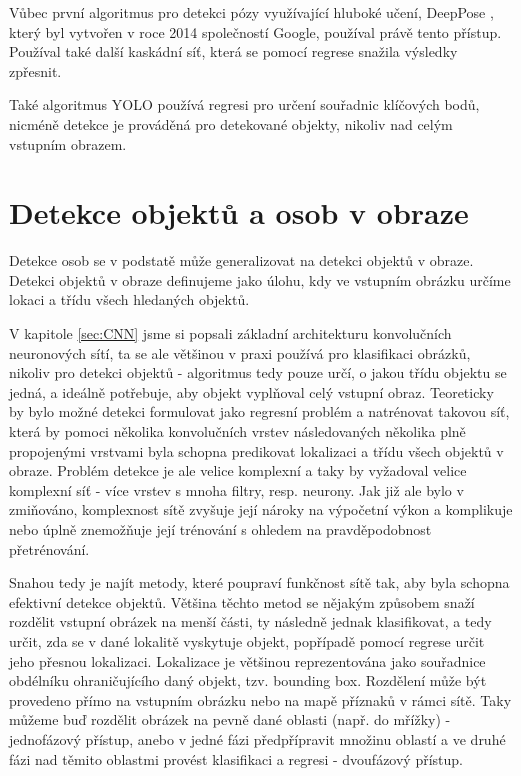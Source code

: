 Vůbec první algoritmus pro detekci pózy využívající hluboké učení, DeepPose \cite{deep-pose}, který byl
vytvořen v roce 2014 společností Google, používal právě tento přístup. Používal
také další kaskádní síť, která se pomocí regrese snažila výsledky zpřesnit. 

Také algoritmus YOLO používá regresi pro určení souřadnic klíčových bodů,
nicméně detekce je prováděná pro detekované objekty, nikoliv nad celým vstupním
obrazem. \cite{yolo-pose}


\section{Detekce objektů a osob v obraze}

Detekce osob se v podstatě může generalizovat na detekci objektů v obraze.
Detekci objektů v obraze definujeme jako úlohu, kdy ve vstupním obrázku určíme
lokaci a třídu všech hledaných objektů.

V kapitole \ref{sec:CNN} jsme si popsali základní architekturu konvolučních
neuronových sítí, ta se ale většinou v praxi používá pro klasifikaci obrázků,
nikoliv pro detekci objektů - algoritmus tedy pouze určí, o jakou třídu objektu
se jedná, a ideálně potřebuje, aby objekt vyplňoval celý vstupní obraz.
Teoreticky by bylo možné detekci formulovat jako regresní problém a natrénovat
takovou síť, která by pomoci několika konvolučních vrstev následovaných
několika plně propojenými vrstvami byla schopna predikovat lokalizaci a třídu
všech objektů v obraze. \cite{szegedy} Problém detekce je ale velice komplexní
a taky by vyžadoval velice komplexní síť - více vrstev s mnoha filtry, resp.
neurony. Jak již ale bylo v zmiňováno, komplexnost sítě zvyšuje její nároky na
výpočetní výkon a komplikuje nebo úplně znemožňuje její trénování s ohledem na
pravděpodobnost přetrénování.

Snahou tedy je najít metody, které poupraví funkčnost sítě tak, aby byla
schopna efektivní detekce objektů. Většina těchto metod se nějakým způsobem
snaží rozdělit vstupní obrázek na menší části, ty následně jednak klasifikovat,
a tedy určit, zda se v dané lokalitě vyskytuje objekt, popřípadě pomocí regrese
určit jeho přesnou lokalizaci. Lokalizace je většinou reprezentována jako
souřadnice obdélníku ohraničujícího daný objekt, tzv. bounding box. Rozdělení
může být provedeno přímo na vstupním obrázku nebo na mapě příznaků v rámci
sítě. Taky můžeme buď rozdělit obrázek na pevně dané oblasti (např. do mřížky)
- jednofázový přístup, anebo v jedné fázi předpřípravit množinu oblastí a ve
druhé fázi nad těmito oblastmi provést klasifikaci a regresi - dvoufázový
přístup.

